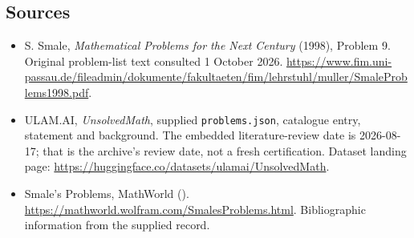 \documentclass[11pt,a4paper]{article}
\begin{document}
\subsection{Sources}

{\small

\begin{itemize}
\item[E1] S. Smale, \emph{Mathematical Problems for the Next Century} (1998), Problem 9. Original problem-list text consulted 1 October 2026. \url{https://www.fim.uni-passau.de/fileadmin/dokumente/fakultaeten/fim/lehrstuhl/muller/SmaleProblems1998.pdf}.


\item[\hypertarget{source:statement:1}{S1}] ULAM.AI, \emph{UnsolvedMath}, supplied \texttt{problems.json}, catalogue entry, statement and background. The embedded literature-review date is 2026-08-17; that is the archive’s review date, not a fresh certification. Dataset landing page: \url{https://huggingface.co/datasets/ulamai/UnsolvedMath}.

\item[\hypertarget{source:statement:2}{S2}] Smale's Problems, MathWorld (). \url{https://mathworld.wolfram.com/SmalesProblems.html}. Bibliographic information from the supplied record.

\end{itemize}

}

\label{end:statement}
\end{document}
